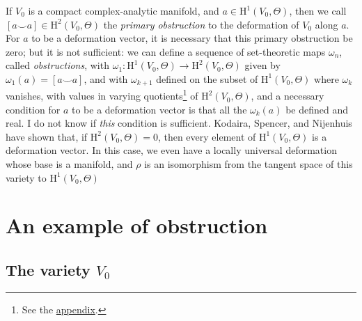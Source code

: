 \documentclass{article}
\newcommand{\HH}{\mathrm{H}}
\begin{document}
If $V_0$ is a compact complex-analytic manifold, and $a\in\HH^1(V_0,\Theta)$, then we call $[a\smile a]\in\HH^2(V_0,\Theta)$ the \emph{primary obstruction} to the deformation of $V_0$ along $a$.
For $a$ to be a deformation vector, it is necessary that this primary obstruction be zero;
but it is not sufficient: we can define a sequence of set-theoretic maps $\omega_n$, called \emph{obstructions}, with $\omega_1\colon\HH^1(V_0,\Theta)\to\HH^2(V_0,\Theta)$ given by $\omega_1(a)=[a\smile a]$, and with $\omega_{k+1}$ defined on the subset of $\HH^1(V_0,\Theta)$ where $\omega_k$ vanishes, with values in varying quotients\footnote{See the \hyperref[appendix]{appendix}.} of $\HH^2(V_0,\Theta)$, and a necessary condition for $a$ to be a deformation vector is that all the $\omega_k(a)$ be defined and real.
I do not know if \emph{this} condition is sufficient.
Kodaira, Spencer, and Nijenhuis \cite{4} have shown that, if $\HH^2(V_0,\Theta)=0$, then every element of $\HH^1(V_0,\Theta)$ is a deformation vector.
In this case, we even have a locally universal deformation whose base is a manifold, and $\rho$ is an isomorphism from the tangent space of this variety to $\HH^1(V_0,\Theta)$


\section{An example of obstruction}
\label{III}


\subsection{The variety \texorpdfstring{$V_0$}{V0}}
\label{III.1}
\end{document}
